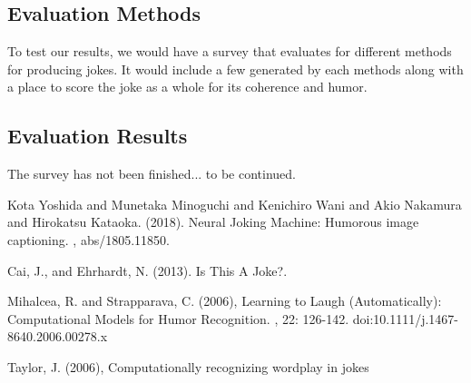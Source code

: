\documentclass[twoside,twocolumn]{article}
\begin{document}
\subsection{Evaluation Methods}

To test our results, we would have a survey that evaluates for different methods for producing jokes. It would include a few generated by each methods along with a place to score the joke as a whole for its coherence and humor.

\subsection{Evaluation Results}

The survey has not been finished... to be continued.



\begin{thebibliography}{99} %


Kota Yoshida and Munetaka Minoguchi and Kenichiro Wani and Akio Nakamura and Hirokatsu Kataoka. (2018).
\newblock Neural Joking Machine: Humorous image captioning.
, abs/1805.11850.

Cai, J., and Ehrhardt, N. (2013). 
\newblock Is This A Joke?.

Mihalcea, R. and Strapparava, C. (2006), 
\newblock Learning to Laugh (Automatically): Computational Models for Humor Recognition.
, 22: 126-142. doi:10.1111/j.1467-8640.2006.00278.x

Taylor, J. (2006), 
\newblock Computationally recognizing wordplay in jokes

\end{thebibliography}

\end{document}
